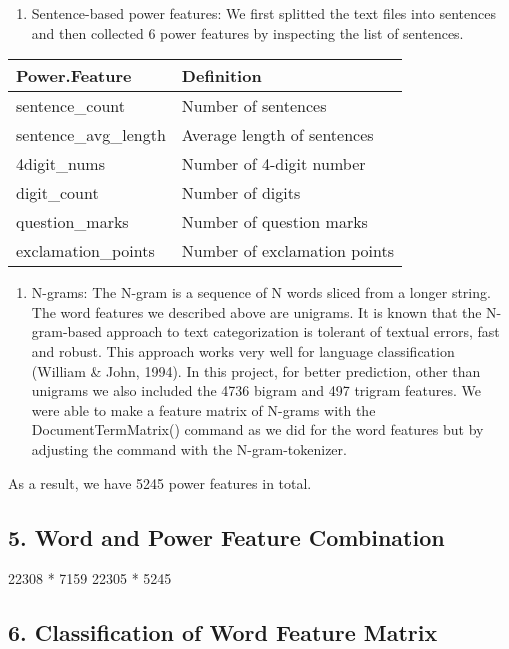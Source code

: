 \documentclass[12pt,]{article}
\begin{document}
\begin{enumerate}
\def\labelenumi{(\arabic{enumi})}
\setcounter{enumi}{1}
\itemsep1pt\parskip0pt
\item
  Sentence-based power features: We first splitted the text files into
  sentences and then collected 6 power features by inspecting the list
  of sentences.
\end{enumerate}

\begin{longtable}[c]{@{}ll@{}}
\toprule
Power.Feature & Definition\tabularnewline
\midrule
\endhead
sentence\_count & Number of sentences\tabularnewline
sentence\_avg\_length & Average length of sentences\tabularnewline
4digit\_nums & Number of 4-digit number\tabularnewline
digit\_count & Number of digits\tabularnewline
question\_marks & Number of question marks\tabularnewline
exclamation\_points & Number of exclamation points\tabularnewline
\bottomrule
\end{longtable}

\begin{enumerate}
\def\labelenumi{(\arabic{enumi})}
\setcounter{enumi}{2}
\itemsep1pt\parskip0pt
\item
  N-grams: The N-gram is a sequence of N words sliced from a longer
  string. The word features we described above are unigrams. It is known
  that the N-gram-based approach to text categorization is tolerant of
  textual errors, fast and robust. This approach works very well for
  language classification (William \& John, 1994). In this project, for
  better prediction, other than unigrams we also included the 4736
  bigram and 497 trigram features. We were able to make a feature matrix
  of N-grams with the DocumentTermMatrix() command as we did for the
  word features but by adjusting the command with the N-gram-tokenizer.
\end{enumerate}

As a result, we have 5245 power features in total.

\subsection{{5. Word and Power Feature
Combination}}\label{word-and-power-feature-combination}

22308 * 7159 22305 * 5245

\subsection{{6. Classification of Word Feature
Matrix}}\label{classification-of-word-feature-matrix}
\end{document}
